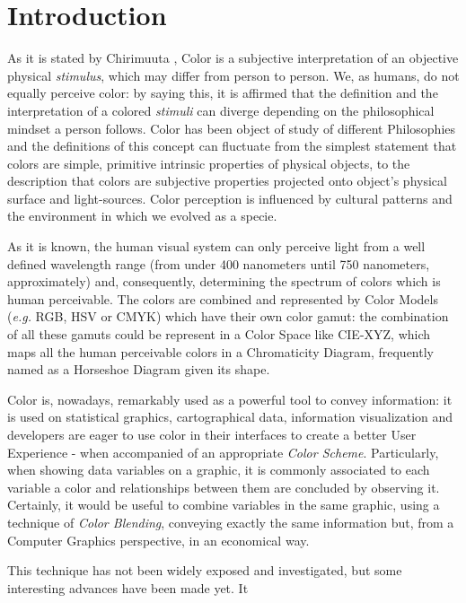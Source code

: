
\section{Introduction}
\label{sec:introduction}
%
As it is stated by Chirimuuta \cite{Chirimuuta2014}, Color is a subjective interpretation of an objective physical
\emph{stimulus}, which may differ from person to person. We, as humans, do not equally perceive color: by saying
this, it is affirmed that the definition and the interpretation of a colored \emph{stimuli} can diverge depending
on the philosophical mindset a person follows. Color has been object of study of different Philosophies and the
definitions of this concept can fluctuate from the simplest statement that colors are simple, primitive intrinsic
properties of physical objects, to the description that colors are subjective properties projected onto object’s
physical surface and light-sources. Color perception is influenced by cultural patterns and the environment in which
we evolved as a specie. \par
%
As it is known, the human visual system can only perceive light from a well defined wavelength range (from under 400
nanometers until 750 nanometers, approximately) and, consequently, determining the spectrum of colors which is human
perceivable. The colors are combined and represented by Color Models (\emph{e.g.} RGB, HSV or CMYK) which have their
own color gamut: the combination of all these gamuts could be represent in a Color Space like CIE-XYZ, which maps all
the human perceivable colors in a Chromaticity Diagram, frequently named as a Horseshoe Diagram given its shape. \par
%
Color is, nowadays, remarkably used as a powerful tool to convey information: it is used on statistical graphics,
cartographical data, information visualization and developers are eager to use color in their interfaces to
create a better User Experience - when accompanied of an appropriate \emph{Color Scheme}. Particularly, when
showing data variables on a graphic, it is commonly associated to each variable a color and relationships between
them are concluded by observing it. Certainly, it would be useful to combine variables in the same graphic, using
a technique of \emph{Color Blending}, conveying exactly the same information but, from a Computer Graphics
perspective, in an economical way. \par
%
This technique has not been widely exposed and investigated, but some interesting advances have been made yet. It
